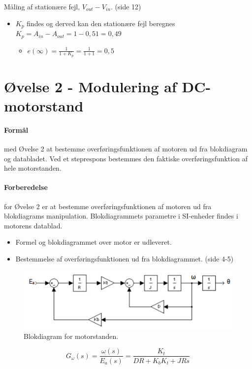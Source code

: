 \documentclass[danish]{article}
\begin{document}
Måling af stationære fejl, $V_{out} - V_{in}$. (side 12)
\begin{itemize}
	\item $K_p$ findes og derved kan den stationære fejl beregnes $K_p = A_{in}-A_{out} = 1 - 0,51 = 0,49$
	\begin{itemize}
		\item $ e(\infty)= \frac{1}{1+K_p} = \frac{1}{1+1} = 0,5$
	\end{itemize}
\end{itemize}


\section{Øvelse 2 -	Modulering af DC-motorstand}
\paragraph{Formål} med Øvelse 2 at bestemme overføringsfunktionen af motoren ud fra blokdiagram og databladet. Ved et steprespons bestemmes den faktiske overføringsfunktion af hele motorstanden.

\paragraph{Forberedelse} for Øvelse 2 er at bestemme overføringsfunktionen af motoren ud fra blokdiagrams manipulation. Blokdiagrammets parametre i SI-enheder findes i motorens datablad. 
\begin{itemize}
	\item Formel og blokdiagrammet over motor er udleveret.
	\item Bestemmelse af overføringsfunktionen ud fra blokdiagrammet. (side 4-5)
\end{itemize}

\begin{figure} [H]
	\centering
	\includegraphics[width=0.6\linewidth]{graphics/ovelse2_1}
	\caption{Blokdiagram for motorstanden.}
	\label{fig:ovelse2_1}
\end{figure}

\begin{equation}
G_{\omega}(s) = \dfrac{\omega(s)}{E_a(s)} = \dfrac{K_t}{D R+K_b K_t+J R s}
\end{equation}
\end{document}

